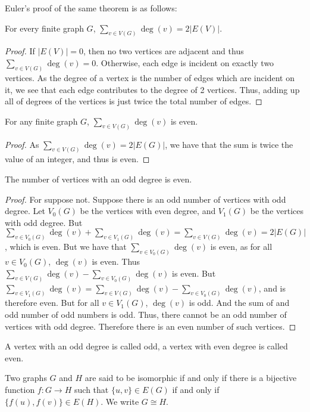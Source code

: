 \documentclass[crop=false,class=book,oneside]{standalone}
\begin{document}
        Euler's proof of the same theorem is as follows:
        \begin{theorem}
        For every finite graph $G$, $\sum_{v\in V(G)}\deg(v) = 2|E(V)|$.
        \end{theorem}
        \begin{proof}
        If $|E(V)| = 0$, then no two vertices are adjacent and thus $\sum_{v\in V(G)}\deg(v) = 0$. Otherwise, each edge is incident on exactly two vertices. As the degree of a vertex is the number of edges which are incident on it, we see that each edge contributes to the degree of 2 vertices. Thus, adding up all of degrees of the vertices is just twice the total number of edges.
        \end{proof}
        \begin{corollary}
        For any finite graph $G$, $\sum_{v\in V(G)}\deg(v)$ is even.
        \end{corollary}
        \begin{proof} As $\sum_{v\in V(G)}\deg(v) = 2|E(G)|$, we have that the sum is twice the value of an integer, and thus is even.
        \end{proof}
        \begin{corollary}
        The number of vertices with an odd degree is even.
        \end{corollary}
        \begin{proof}
        For suppose not. Suppose there is an odd number of vertices with odd degree. Let $V_0(G)$ be the vertices with even degree, and $V_1(G)$ be the vertices with odd degree. But $\sum_{v\in V_0(G)}\deg(v) + \sum_{v\in V_1(G)} \deg(v) = \sum_{v\in V(G)}\deg(v) = 2|E(G)|$, which is even. But we have that $\sum_{v\in V_0(G)}\deg(v)$ is even, as for all $v\in V_{0}(G)$, $\deg(v)$ is even. Thus $\sum_{v\in V(G)}\deg(v) - \sum_{v\in V_0(G)}\deg(v)$ is even. But $\sum_{v\in V_1(G)}\deg(v) = \sum_{v\in V(G)}\deg(v) - \sum_{v\in V_0(G)}\deg(v)$, and is therefore even. But for all $v\in V_1(G)$, $\deg(v)$ is odd. And the sum of and odd number of odd numbers is odd. Thus, there cannot be an odd number of vertices with odd degree. Therefore there is an even number of such vertices.
        \end{proof}
        \begin{definition}
        A vertex with an odd degree is called odd, a vertex with even degree is called even.
        \end{definition}
        \begin{definition}
        Two graphs $G$ and $H$ are said to be isomorphic if and only if there is a bijective function $f:G\rightarrow H$ such that $\{u,v\}\in E(G)$ if and only if $\{f(u),f(v)\}\in E(H)$. We write $G \cong H$.
        \end{definition}
\end{document}
